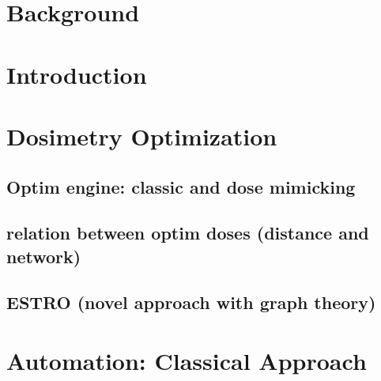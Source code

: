 \documentclass[a4paper,12pt]{book}
\begin{document}
	
	
	
	
	
	
	
	\listoffigures
	\listoftables
	\tableofcontents
		
	\chapterStyleToC
	\chapter{Background}
	\begin{chapterabstract}
		
	\end{chapterabstract}
	\clearpage
	\localtableofcontents
	
	
	\chapter{Introduction}
	\begin{chapterabstract}
		
	\end{chapterabstract}
	\clearpage
	\localtableofcontents
	
	
	\chapter{Dosimetry Optimization}
	\begin{chapterabstract}
	\end{chapterabstract}
	\clearpage
	\localtableofcontents
	\section{Optim engine: classic and dose mimicking}
	\section{relation between optim doses (distance and network)}
	\section{ESTRO (novel approach with graph theory)}
	
	\chapter{Automation: Classical Approach}
	\begin{chapterabstract}
	\end{chapterabstract}
	\clearpage
	\localtableofcontents
\end{document}
